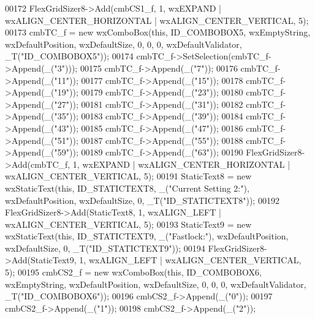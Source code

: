 \begin{DoxyCode}
00172     FlexGridSizer8->Add(cmbCS1\_f, 1, wxEXPAND | wxALIGN\_CENTER\_HORIZONTAL | wxALIGN\_CENTER\_VERTICAL, 5);
00173     cmbTC\_f = \textcolor{keyword}{new} wxComboBox(\textcolor{keyword}{this}, ID\_COMBOBOX5, wxEmptyString, wxDefaultPosition, wxDefaultSize, 0, 0, 0, 
      wxDefaultValidator, \_T(\textcolor{stringliteral}{"ID\_COMBOBOX5"}));
00174     cmbTC\_f->SetSelection(cmbTC\_f->Append(\_(\textcolor{stringliteral}{"3"})));
00175     cmbTC\_f->Append(\_(\textcolor{stringliteral}{"7"}));
00176     cmbTC\_f->Append(\_(\textcolor{stringliteral}{"11"}));
00177     cmbTC\_f->Append(\_(\textcolor{stringliteral}{"15"}));
00178     cmbTC\_f->Append(\_(\textcolor{stringliteral}{"19"}));
00179     cmbTC\_f->Append(\_(\textcolor{stringliteral}{"23"}));
00180     cmbTC\_f->Append(\_(\textcolor{stringliteral}{"27"}));
00181     cmbTC\_f->Append(\_(\textcolor{stringliteral}{"31"}));
00182     cmbTC\_f->Append(\_(\textcolor{stringliteral}{"35"}));
00183     cmbTC\_f->Append(\_(\textcolor{stringliteral}{"39"}));
00184     cmbTC\_f->Append(\_(\textcolor{stringliteral}{"43"}));
00185     cmbTC\_f->Append(\_(\textcolor{stringliteral}{"47"}));
00186     cmbTC\_f->Append(\_(\textcolor{stringliteral}{"51"}));
00187     cmbTC\_f->Append(\_(\textcolor{stringliteral}{"55"}));
00188     cmbTC\_f->Append(\_(\textcolor{stringliteral}{"59"}));
00189     cmbTC\_f->Append(\_(\textcolor{stringliteral}{"63"}));
00190     FlexGridSizer8->Add(cmbTC\_f, 1, wxEXPAND | wxALIGN\_CENTER\_HORIZONTAL | wxALIGN\_CENTER\_VERTICAL, 5);
00191     StaticText8 = \textcolor{keyword}{new} wxStaticText(\textcolor{keyword}{this}, ID\_STATICTEXT8, \_(\textcolor{stringliteral}{"Current Setting 2:"}), wxDefaultPosition, 
      wxDefaultSize, 0, \_T(\textcolor{stringliteral}{"ID\_STATICTEXT8"}));
00192     FlexGridSizer8->Add(StaticText8, 1, wxALIGN\_LEFT | wxALIGN\_CENTER\_VERTICAL, 5);
00193     StaticText9 = \textcolor{keyword}{new} wxStaticText(\textcolor{keyword}{this}, ID\_STATICTEXT9, \_(\textcolor{stringliteral}{"Fastlock:"}), wxDefaultPosition, wxDefaultSize, 
      0, \_T(\textcolor{stringliteral}{"ID\_STATICTEXT9"}));
00194     FlexGridSizer8->Add(StaticText9, 1, wxALIGN\_LEFT | wxALIGN\_CENTER\_VERTICAL, 5);
00195     cmbCS2\_f = \textcolor{keyword}{new} wxComboBox(\textcolor{keyword}{this}, ID\_COMBOBOX6, wxEmptyString, wxDefaultPosition, wxDefaultSize, 0, 0, 0,
       wxDefaultValidator, \_T(\textcolor{stringliteral}{"ID\_COMBOBOX6"}));
00196     cmbCS2\_f->Append(\_(\textcolor{stringliteral}{"0"}));
00197     cmbCS2\_f->Append(\_(\textcolor{stringliteral}{"1"}));
00198     cmbCS2\_f->Append(\_(\textcolor{stringliteral}{"2"}));

\end{DoxyCode}
